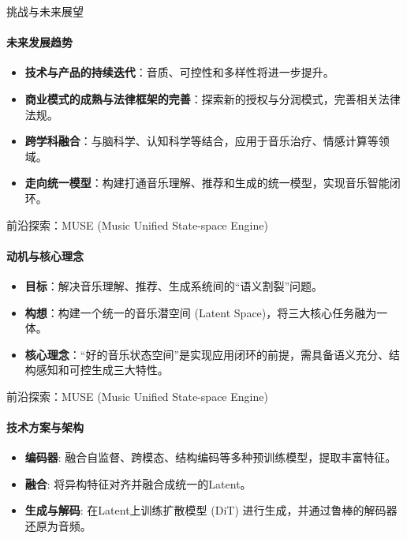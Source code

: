 \documentclass{beamer}
\begin{document}
\begin{frame}{挑战与未来展望}
  \framesubtitle{未来发展趋势}
  \begin{itemize}
    \item \textbf{技术与产品的持续迭代}：音质、可控性和多样性将进一步提升。
    \item \textbf{商业模式的成熟与法律框架的完善}：探索新的授权与分润模式，完善相关法律法规。
    \item \textbf{跨学科融合}：与脑科学、认知科学等结合，应用于音乐治疗、情感计算等领域。
    \item \textbf{走向统一模型}：构建打通音乐理解、推荐和生成的统一模型，实现音乐智能闭环。
  \end{itemize}
\end{frame}

\begin{frame}{前沿探索：MUSE (Music Unified State-space Engine)}
  \framesubtitle{动机与核心理念}
  \begin{itemize}
    \item \textbf{目标}：解决音乐理解、推荐、生成系统间的“语义割裂”问题。
    \item \textbf{构想}：构建一个统一的音乐潜空间 (Latent Space)，将三大核心任务融为一体。
    \item \textbf{核心理念}：“好的音乐状态空间”是实现应用闭环的前提，需具备语义充分、结构感知和可控生成三大特性。
  \end{itemize}
\end{frame}

\begin{frame}{前沿探索：MUSE (Music Unified State-space Engine)}
  \framesubtitle{技术方案与架构}
    \begin{center}
    \end{center}
    
    \begin{itemize}
        \item \textbf{编码器}: 融合自监督、跨模态、结构编码等多种预训练模型，提取丰富特征。
        \item \textbf{融合}: 将异构特征对齐并融合成统一的Latent。
        \item \textbf{生成与解码}: 在Latent上训练扩散模型 (DiT) 进行生成，并通过鲁棒的解码器还原为音频。
    \end{itemize}
\end{frame}
\end{document}
